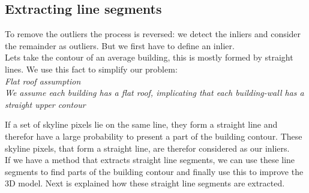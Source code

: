 \documentclass[10pt]{article}
\begin{document}


\subsection{Extracting line segments}
%



	To remove the outliers the process is reversed: we detect the
	inliers and consider the remainder as outliers. But we first have to define an inlier.\\
	Lets take the contour of an average building, this is mostly formed by
	straight lines. We use this fact to simplify our problem:\\
	\emph{Flat roof assumption}\\
	\emph{We assume each building has a flat roof, implicating that each building-wall
	has a straight upper contour}

	If a set of skyline pixels lie on the same line, they form a straight line
	and therefor have a large probability to present a part of the building contour.
	These skyline pixels, that form a straight line, are therefor considered as our
	inliers.\\ 
	If we have a method that extracts straight line segments, we can use these
	line segments to find parts of the building contour and finally use this to improve the 3D
	model. Next is explained how these straight line segments are extracted.
	
\end{document}
